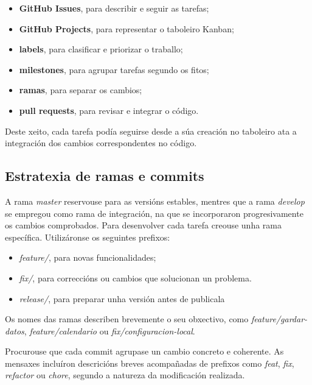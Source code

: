 \begin{itemize}
    \item \textbf{GitHub Issues}, para describir e seguir as tarefas;
    \item \textbf{GitHub Projects}, para representar o taboleiro Kanban;
    \item \textbf{labels}, para clasificar e priorizar o traballo;
    \item \textbf{milestones}, para agrupar tarefas segundo os fitos;
    \item \textbf{ramas}, para separar os cambios;
    \item \textbf{pull requests}, para revisar e integrar o código.
\end{itemize}

Deste xeito, cada tarefa podía seguirse desde a súa creación no taboleiro ata a integración dos cambios correspondentes no código.

\subsection{Estratexia de ramas e commits}
A rama \textit{master} reservouse para as versións estables, mentres que a rama \textit{develop} se empregou como rama de integración, na que se incorporaron progresivamente os cambios comprobados. Para desenvolver cada tarefa creouse unha rama específica. Utilizáronse os seguintes prefixos:

\begin{itemize}
    \item \textit{feature/}, para novas funcionalidades;
    \item \textit{fix/}, para correccións ou cambios que solucionan un problema.
    \item \textit{release/}, para preparar unha versión antes de publicala
\end{itemize}

Os nomes das ramas describen brevemente o seu obxectivo, como \textit{feature/gardar-datos}, \textit{feature/calendario} ou \textit{fix/configuracion-local}.

Procurouse que cada commit agrupase un cambio concreto e coherente. As mensaxes incluíron descricións breves acompañadas de prefixos como \textit{feat}, \textit{fix}, \textit{refactor} ou \textit{chore}, segundo a natureza da modificación realizada.


